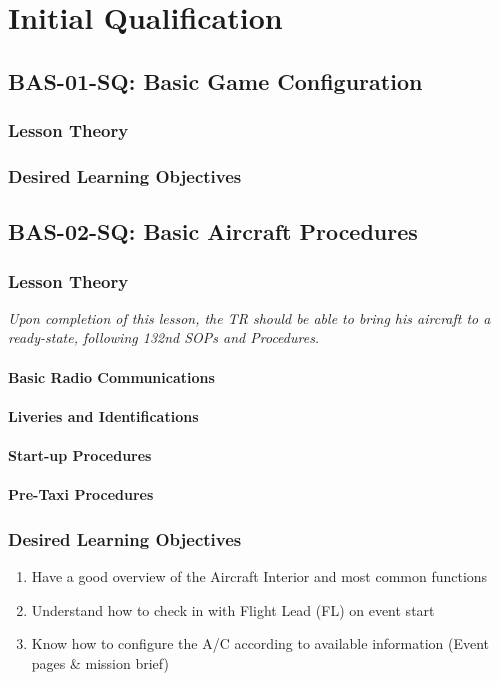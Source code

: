 \part{Initial Qualification}
  \chapter{BAS-01-SQ: Basic Game Configuration}
    \section{Lesson Theory}
    \section{Desired Learning Objectives}

  \chapter{BAS-02-SQ: Basic Aircraft Procedures}
    \section{Lesson Theory}
      \textit{Upon completion of this lesson, the TR should be able to bring his aircraft to a ready-state, following 132nd SOPs and Procedures.}
      \subsection{Basic Radio Communications}
      \subsection{Liveries and Identifications}
      \subsection{Start-up Procedures}
      \subsection{Pre-Taxi Procedures}

    \section{Desired Learning Objectives}
      \begin{enumerate}
        \item Have a good overview of the Aircraft Interior and most common functions
        \item Understand how to check in with Flight Lead (FL) on event start
        \item Know how to configure the A/C according to available information (Event pages \& mission brief)
      \end{enumerate}

